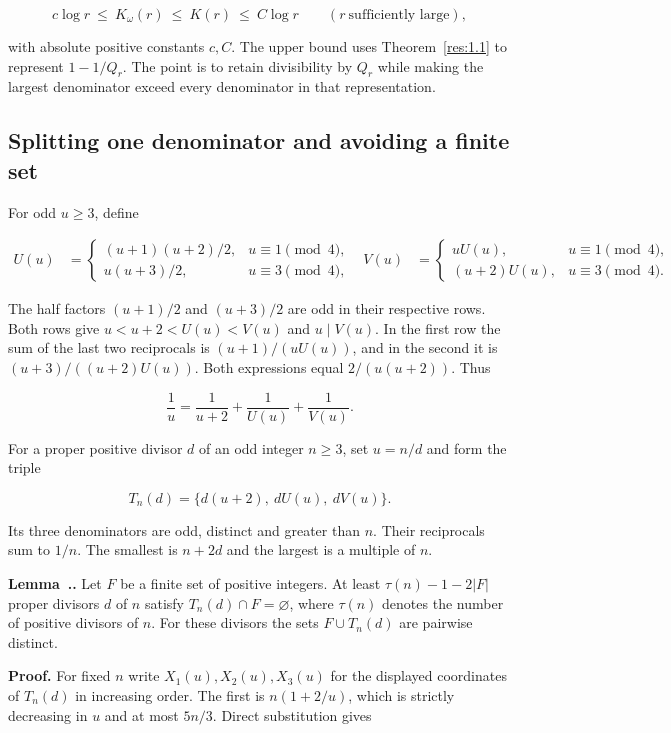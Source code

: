 \documentclass[11pt,a4paper]{article}
\newcounter{result}[section]
\renewcommand{\theresult}{\thesection.\arabic{result}}
\newcommand{\paperstatement}[3]{%
  \refstepcounter{result}\label{res:#2}%
  \noindent\textbf{#1~\theresult#3.}\enspace\ignorespaces}
\begin{document}
\[
c\log r\ \le\ K_\omega(r)\ \le\ K(r)\ \le\ C\log r
 \qquad (r\ \text{sufficiently large}),
\]

with absolute positive constants $c,C$. The upper bound uses Theorem~\ref{res:1.1} to represent $1-1/Q_r$. The point is to retain divisibility by $Q_r$ while making the largest denominator exceed every denominator in that representation.

\subsection{Splitting one denominator and avoiding a finite set}

For odd $u\ge3$, define

\[
\begin{aligned}
 U(u)&=
 \begin{cases}
 (u+1)(u+2)/2,&u\equiv1\pmod4,\\
 u(u+3)/2,&u\equiv3\pmod4,
 \end{cases}
&
 V(u)&=
 \begin{cases}
 uU(u),&u\equiv1\pmod4,\\
 (u+2)U(u),&u\equiv3\pmod4.
 \end{cases}
\end{aligned}
\]

The half factors $(u+1)/2$ and $(u+3)/2$ are odd in their respective rows. Both rows give $u<u+2<U(u)<V(u)$ and $u\mid V(u)$. In the first row the sum of the last two reciprocals is $(u+1)/(uU(u))$, and in the second it is $(u+3)/((u+2)U(u))$. Both expressions equal $2/(u(u+2))$. Thus

\[
\frac1u=\frac1{u+2}+\frac1{U(u)}+\frac1{V(u)}.
\]

For a proper positive divisor $d$ of an odd integer $n\ge3$, set $u=n/d$ and form the triple

\[
T_n(d)=\{d(u+2),\ dU(u),\ dV(u)\}.
\]

Its three denominators are odd, distinct and greater than $n$. Their reciprocals sum to $1/n$. The smallest is $n+2d$ and the largest is a multiple of $n$.

\paperstatement{Lemma}{4.1}{} Let $F$ be a finite set of positive integers. At least $\tau(n)-1-2|F|$ proper divisors $d$ of $n$ satisfy $T_n(d)\cap F=\varnothing$, where $\tau(n)$ denotes the number of positive divisors of $n$. For these divisors the sets $F\cup T_n(d)$ are pairwise distinct.

\textbf{Proof.} For fixed $n$ write $X_1(u),X_2(u),X_3(u)$ for the displayed coordinates of $T_n(d)$ in increasing order. The first is $n(1+2/u)$, which is strictly decreasing in $u$ and at most $5n/3$. Direct substitution gives
\end{document}
